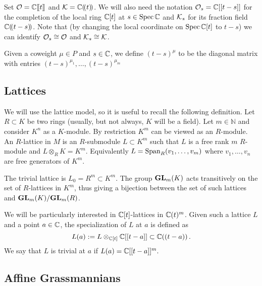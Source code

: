 \documentclass{article}
\begin{document}
Set $\cO = \CC\xt$ and $\cK = \CC\xT$. We will also need the notation $\cO_s = \CC[[t-s]]$ for the completion of the local ring $\CC[t]$ at $s\in\spec\CC$ and $\cK_s$ for its fraction field $\CC\xT[t-s]$. 
% 
Note that (by changing the local coordinate on $\spec\CC[t]$ to $t-s$) we can identify $\cO_s \cong \cO$ and $\cK_s\cong\cK$. 

Given a coweight $\mu \in P$ and $ s\in \CC$, we define $ (t-s)^\mu$ to be the diagonal matrix with entries $ (t-s)^{\mu_1}, \dots, (t-s)^{\mu_m}$


\subsection{Lattices}
\label{ss:lat}
We will use the lattice model, so it is useful to recall the following definition.  Let $ R \subset K$ be two rings (usually, but not always, $K $ will be a field).  Let $ m \in \mathbb N$ and consider $ K^n $ as a $K$-module.   By restriction $ K^m$ can be viewed as an $R$-module.  An $R$-lattice in $ M$ is an $R$-submodule $ L \subset K^m$ such that $ L $ is a free rank $ m $ $R$-module and $ L \otimes_R K = K^m $.  Equivalently $ L = \Sp_R(v_1, \dots, v_m)$ where $ v_1, \dots, v_n$ are free generators of $K^m$.  

The trivial lattice is $L_0 = R^m \subset K^m $.  The group $\GL_m(K) $ acts transitively on the set of $ R$-lattices in $K^m$, thus giving a bijection between the set of such lattices and $\GL_m(K)/\GL_m(R)$.

We will be particularly interested in $\CC[t]$-lattices in $ \CC(t)^m$.  Given such a lattice $ L $ and a point $ a \in \CC$, the specialization of $ L $ at $ a $ is defined as
$$
L(a) := L \otimes_{\CC[t]} \CC[[t-a]] \subset \CC((t-a))\,.
$$
We say that $ L $ is trivial at $ a $ if $ L(a) = \CC[[t-a]]^m.$




\subsection{Affine Grassmannians} %
\end{document}
